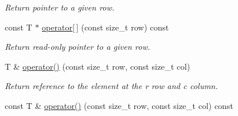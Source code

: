 \begin{DoxyCompactItemize}
\begin{DoxyCompactList}\small\item\em Return pointer to a given row. \end{DoxyCompactList}\item 
\hypertarget{classanpi_1_1_matrix_a13da6bd67304aac627c88f7213d5593c}{}const T $\ast$ \hyperlink{classanpi_1_1_matrix_a13da6bd67304aac627c88f7213d5593c}{operator\mbox{[}$\,$\mbox{]}} (const size\+\_\+t row) const \label{classanpi_1_1_matrix_a13da6bd67304aac627c88f7213d5593c}

\begin{DoxyCompactList}\small\item\em Return read-\/only pointer to a given row. \end{DoxyCompactList}\item 
\hypertarget{classanpi_1_1_matrix_aefaff4b28c12084a0c268573e96cf9ca}{}T \& \hyperlink{classanpi_1_1_matrix_aefaff4b28c12084a0c268573e96cf9ca}{operator()} (const size\+\_\+t row, const size\+\_\+t col)\label{classanpi_1_1_matrix_aefaff4b28c12084a0c268573e96cf9ca}

\begin{DoxyCompactList}\small\item\em Return reference to the element at the r row and c column. \end{DoxyCompactList}\item 
\hypertarget{classanpi_1_1_matrix_aca2952db0943940e16c715304185be7e}{}const T \& \hyperlink{classanpi_1_1_matrix_aca2952db0943940e16c715304185be7e}{operator()} (const size\+\_\+t row, const size\+\_\+t col) const \label{classanpi_1_1_matrix_aca2952db0943940e16c715304185be7e}


\end{DoxyCompactItemize}
